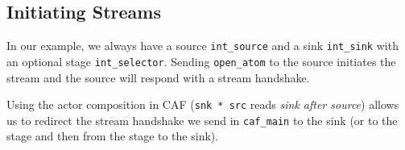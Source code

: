 \clearpage

\subsection{Initiating Streams}


In our example, we always have a source \lstinline^int_source^ and a sink
\lstinline^int_sink^ with an optional stage \lstinline^int_selector^. Sending
\lstinline^open_atom^ to the source initiates the stream and the source will
respond with a stream handshake.

Using the actor composition in CAF (\lstinline^snk * src^ reads \emph{sink
after source}) allows us to redirect the stream handshake we send in
\lstinline^caf_main^ to the sink (or to the stage and then from the stage to
the sink).

